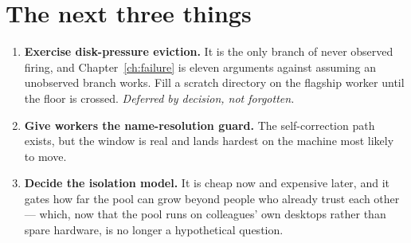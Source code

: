 \section{The next three things}

\begin{enumerate}
  \item \textbf{Exercise disk-pressure eviction.} It is the only branch of
         never observed firing, and Chapter~\ref{ch:failure}
        is eleven arguments against assuming an unobserved branch works. Fill a
        scratch directory on the flagship worker until the floor is crossed.
        \emph{Deferred by decision, not forgotten.}
  \item \textbf{Give workers the name-resolution guard.} The self-correction path
        exists, but the window is real and lands hardest on the machine most
        likely to move.
  \item \textbf{Decide the isolation model.} It is cheap now and expensive later,
        and it gates how far the pool can grow beyond people who already trust
        each other --- which, now that the pool runs on colleagues' own desktops
        rather than spare hardware, is no longer a hypothetical question.
\end{enumerate}
